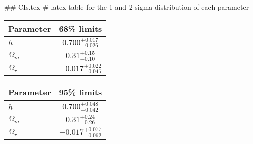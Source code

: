## CIs.tex
# latex table for the 1 and 2 sigma distribution of each parameter

\begin{tabular} { l  c}
 Parameter &  68\% limits\\
\hline
{\boldmath$h              $} & $0.700^{+0.017}_{-0.026}   $\\
{\boldmath$\Omega_m       $} & $0.31^{+0.15}_{-0.10}      $\\
{\boldmath$\Omega_r       $} & $-0.017^{+0.022}_{-0.045}  $\\
\hline
\end{tabular}

\begin{tabular} { l  c}
 Parameter &  95\% limits\\
\hline
{\boldmath$h              $} & $0.700^{+0.048}_{-0.042}   $\\
{\boldmath$\Omega_m       $} & $0.31^{+0.24}_{-0.26}      $\\
{\boldmath$\Omega_r       $} & $-0.017^{+0.077}_{-0.062}  $\\
\hline
\end{tabular}
